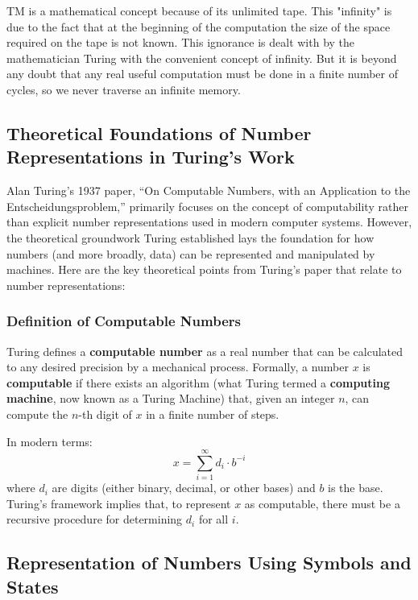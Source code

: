 
TM is a mathematical concept because of its unlimited tape. This "infinity" is due to the fact that at the beginning of the computation the size of the space required on the tape is not known. This ignorance is dealt with by the mathematician Turing with the convenient concept of infinity. But it is beyond any doubt that any real useful computation must be done in a finite number of cycles, so we never traverse an infinite memory.


\subsection{Theoretical Foundations of Number Representations in Turing's Work}

Alan Turing’s 1937 paper, “On Computable Numbers, with an Application to the Entscheidungsproblem,” primarily focuses on the concept of computability rather than explicit number representations used in modern computer systems. However, the theoretical groundwork Turing established lays the foundation for how numbers (and more broadly, data) can be represented and manipulated by machines. Here are the key theoretical points from Turing's paper that relate to number representations:

\subsubsection{Definition of Computable Numbers}

Turing defines a \textbf{computable number} as a real number that can be calculated to any desired precision by a mechanical process. Formally, a number \( x \) is \textbf{computable} if there exists an algorithm (what Turing termed a \textbf{computing machine}, now known as a Turing Machine) that, given an integer \( n \), can compute the \( n \)-th digit of \( x \) in a finite number of steps.

In modern terms:
\[
x = \sum_{i=1}^{\infty} d_i \cdot b^{-i}
\]
where \( d_i \) are digits (either binary, decimal, or other bases) and \( b \) is the base. Turing’s framework implies that, to represent \( x \) as computable, there must be a recursive procedure for determining \( d_i \) for all \( i \).

\subsection{Representation of Numbers Using Symbols and States}


